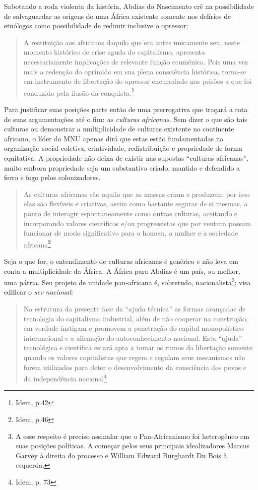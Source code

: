 Sabotando a roda violenta da história, Abdias do Nascimento crê na
possibilidade de salvaguardar as origens de uma África existente somente
nos delírios de etnólogos como possibilidade de redimir inclusive o
opressor:

\begin{quote}
A restituição aos africanos daquilo que era antes unicamente seu, neste
momento histórico de crise aguda do capitalismo, apresenta
necessariamente implicações de relevante função ecumênica. Pois uma vez
mais a redenção do oprimido em sua plena consciência histórica, torna-se
em instrumento de libertação do opressor encurralado nas prisões a que
foi conduzido pela ilusão da conquista.\footnote{Idem, p.42}
\end{quote}

Para justificar suas posições parte então de uma prerrogativa que
traçará a rota de suas argumentações até o fim: \emph{as culturas
africanas}. Sem dizer o que são tais culturas ou demonstrar a
multiplicidade de culturas existente no continente africano, o líder do
MNU apenas dirá que estas estão fundamentadas na organização social
coletiva, criatividade, redistribuição e propriedade de forma
equitativa. A propriedade não deixa de existir nas supostas ``culturas
africanas'', muito embora propriedade seja um substantivo criado,
mantido e defendido a ferro e fogo pelos colonizadores.

\begin{quote}
As culturas africanas são aquilo que as massas criam e produzem: por
isso elas são flexíveis e criativas, assim como bastante seguras de si
mesmas, a ponto de interagir espontaneamente como outras culturas,
aceitando e incorporando valores científicos e/ou progressistas que por
ventura possam funcionar de modo significativo para o homem, a mulher e
a sociedade africana\footnote{Idem, p.46}
\end{quote}

Seja o que for, o entendimento de culturas africanas é genérico e não
leva em conta a multiplicidade da África. A África para Abdias é um
país, ou melhor, uma pátria. Seu projeto de unidade pan-africana é,
sobretudo, nacionalista\footnote{A esse respeito é preciso assinalar que
  o Pan-Africanismo foi heterogêneo em suas posições políticas. A
  começar pelos seus principais idealizadores Marcus Garvey à direita do
  processo e William Edward Burghardt Du Bois à esquerda.}; visa
edificar o \emph{ser nacional}:

\begin{quote}
Na estrutura da presente fase da ``ajuda técnica'' as formas avançadas
de tecnologia do capitalismo industrial, além de não cooperar na
construção, em verdade instigam e promovem a penetração do capital
monopolístico internacional e a alienação do autoconhecimento nacional.
Esta ``ajuda'' tecnológica e científica estará apta a tomar os rumos da
libertação somente quando os valores capitalistas que regem e regulam
seus mecanismos não forem utilizados para deter o desenvolvimento da
consciência dos povos e da independência nacional\footnote{Idem, p. 73}
\end{quote}

